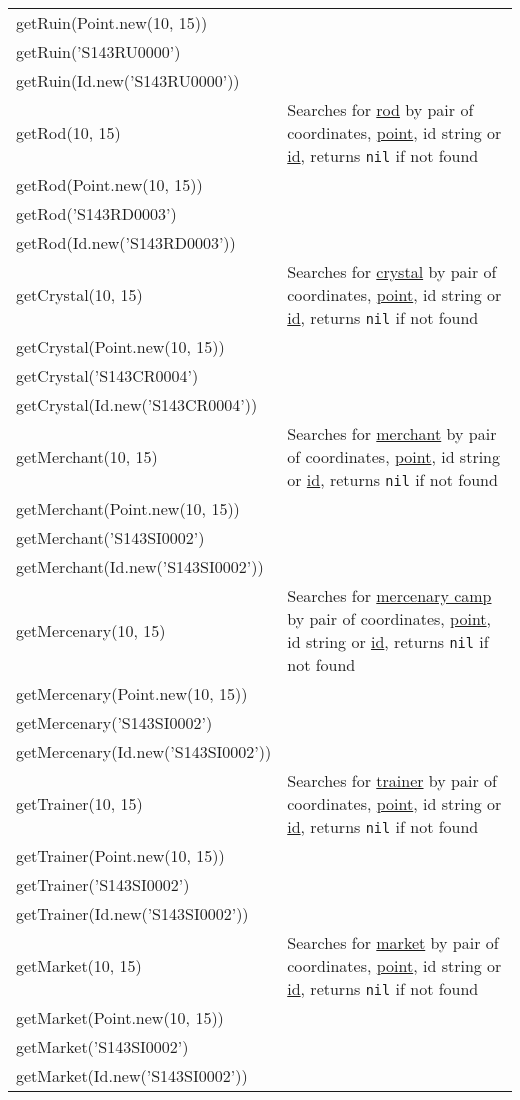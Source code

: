 \begin{center}
\begin{tabularx}{\linewidth}{| l | X |}
getRuin(Point.new(10, 15)) &\\
getRuin('S143RU0000') &\\
getRuin(Id.new('S143RU0000')) &\\
\hline
getRod(10, 15) & Searches for \hyperref[Rod]{rod} by pair of coordinates, \hyperref[Point]{point}, id string or \hyperref[Id]{id}, returns \texttt{nil} if not found\\
getRod(Point.new(10, 15)) &\\
getRod('S143RD0003') &\\
getRod(Id.new('S143RD0003')) &\\
\hline
getCrystal(10, 15) & Searches for \hyperref[Crystal]{crystal} by pair of coordinates, \hyperref[Point]{point}, id string or \hyperref[Id]{id}, returns \texttt{nil} if not found\\
getCrystal(Point.new(10, 15)) &\\
getCrystal('S143CR0004') &\\
getCrystal(Id.new('S143CR0004')) &\\
\hline
getMerchant(10, 15) & Searches for \hyperref[Merchant]{merchant} by pair of coordinates, \hyperref[Point]{point}, id string or \hyperref[Id]{id}, returns \texttt{nil} if not found\\
getMerchant(Point.new(10, 15)) &\\
getMerchant('S143SI0002') &\\
getMerchant(Id.new('S143SI0002')) &\\
\hline
getMercenary(10, 15) & Searches for \hyperref[Mercenary]{mercenary camp} by pair of coordinates, \hyperref[Point]{point}, id string or \hyperref[Id]{id}, returns \texttt{nil} if not found\\
getMercenary(Point.new(10, 15)) &\\
getMercenary('S143SI0002') &\\
getMercenary(Id.new('S143SI0002')) &\\
\hline
getTrainer(10, 15) & Searches for \hyperref[Trainer]{trainer} by pair of coordinates, \hyperref[Point]{point}, id string or \hyperref[Id]{id}, returns \texttt{nil} if not found\\
getTrainer(Point.new(10, 15)) &\\
getTrainer('S143SI0002') &\\
getTrainer(Id.new('S143SI0002')) &\\
\hline
getMarket(10, 15) & Searches for \hyperref[ResourceMarket]{market} by pair of coordinates, \hyperref[Point]{point}, id string or \hyperref[Id]{id}, returns \texttt{nil} if not found\\
getMarket(Point.new(10, 15)) &\\
getMarket('S143SI0002') &\\
getMarket(Id.new('S143SI0002')) &\\
\hline
\end{tabularx}
\end{center}
